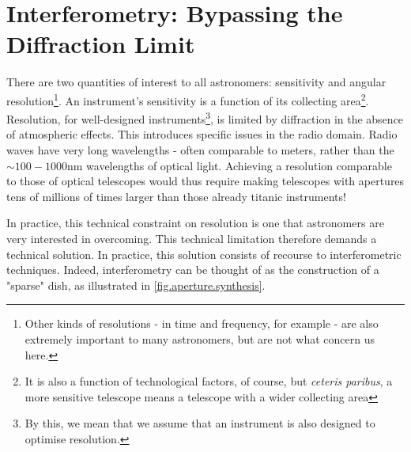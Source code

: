 \section{Interferometry: Bypassing the Diffraction Limit}

\pg
There are two quantities of interest to all astronomers: sensitivity and angular resolution\footnote{Other kinds of resolutions - in time and frequency, for example - are also extremely important to many astronomers, but are not what concern us here.}. An instrument's sensitivity is a function of its collecting area\footnote{It is also a function of technological factors, of course, but \emph{ceteris paribus}, a more sensitive telescope means a telescope with a wider collecting area}. Resolution, for well-designed instruments\footnote{By this, we mean that we assume that an instrument is also designed to optimise resolution.}, is limited by diffraction in the absence of atmospheric effects. This introduces specific issues in the radio domain. Radio waves have very long wavelengths - often comparable to meters, rather than the $\sim100-1000$nm wavelengths of optical light. Achieving a resolution comparable to those of optical telescopes would thus require making telescopes with apertures tens of millions of times larger than those already titanic instruments!

\pg
In practice, this technical constraint on resolution is one that astronomers are very interested in overcoming. This technical limitation therefore demands a technical solution. In practice, this solution consists of recourse to interferometric techniques. Indeed, interferometry can be thought of as the construction of a "sparse" dish, as illustrated in \cref{fig.aperture.synthesis}.

